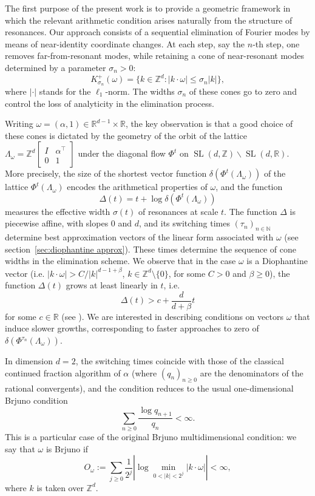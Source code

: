 \documentclass[12pt,reqno,a4paper]{amsart}%
\numberwithin{equation}{section}
\newcommand{\Nn}{{\mathbb{N}}}
\newcommand{\Rr}{{\mathbb{R}}}
\newcommand{\Zz}{{\mathbb{Z}}}
\def\SL{\operatorname{SL}}
\newcommand{\abs}[1]{\left| #1\right|}
\begin{document}
The first purpose of the present work is to provide a geometric framework in which the relevant arithmetic condition arises naturally from the structure of resonances.
Our approach consists of a sequential elimination of Fourier modes by means of near-identity coordinate changes. 
At each step,  say the $n$-th step, one removes  far-from-resonant modes, while retaining a cone of near-resonant modes determined by a parameter $\sigma_n>0$:
\[
K_{\sigma_n}^+(\omega)=\{k\in\Zz^d : |k\cdot\omega|\le \sigma_n |k|\},
\]
where $|\cdot|$ stands for the $\ell_1$-norm. 
The widths $\sigma_n$ of these cones go to zero and control the loss of analyticity in the elimination process.

Writing $\omega=(\alpha,1)\in\Rr^{d-1}\times \Rr$, the key observation is that a good choice of these cones is dictated by the geometry of the orbit of the lattice $\Lambda_\omega=\Zz^d \left[\begin{smallmatrix}I&\alpha^\top\\0&1\end{smallmatrix}\right]$
under the diagonal flow $\Phi^t$ on $\SL(d,\Zz)\backslash\SL(d,\Rr)$. 
More precisely, the size of the shortest vector function
$\delta(\Phi^t(\Lambda_\omega))$ of the lattice $\Phi^t(\Lambda_\omega)$
encodes the arithmetical properties of $\omega$, and the function
\[
\Delta(t)=t+\log\delta(\Phi^t(\Lambda_\omega))
\]
measures the effective width $\sigma(t)$ of resonances at scale $t$.
The function $\Delta$ is piecewise affine, with slopes $0$ and $d$, and its switching times $(\tau_n)_{n\in\Nn}$ determine best approximation vectors of the linear form associated with $\omega$ (see section~\ref{sec:diophantine approx}). 
These times determine the sequence of cone widths in the elimination scheme.  
We observe that in the case $\omega$ is a Diophantine vector (i.e.  $|k\cdot\omega|>C/|k|^{d-1+\beta}$,  $k\in\Zz^{d}\setminus\{0\}$, for some $C>0$ and $\beta\geq0$), the function $\Delta(t)$ grows at least linearly in $t$,  i.e.
$$
\Delta(t)>c+\frac{d}{d+\beta} t
$$ 
for some $c\in\Rr$ (see \cite[Proposition 2.3]{jld10}).
We are interested  in describing conditions on vectors $\omega$ that induce slower growths, corresponding to faster approaches to zero of $\delta(\Phi^{\tau_n}(\Lambda_\omega))$.


In dimension $d=2$, the switching times coincide with those of the classical continued fraction algorithm of $\alpha$ (where $(q_n)_{n\geq0}$ are the denominators of the rational convergents), and the condition reduces to the usual one-dimensional Brjuno condition
\begin{equation}\label{eq: BC 1-dim}
\sum_{n\geq0}\frac{\log q_{n+1}}{q_n} <\infty.
\end{equation}
This is a particular case of the original Brjuno multidimensional condition: we say that $\omega$ is Brjuno if 
$$
O_\omega:=\sum_{j\geq0}\frac1{2^j}
\abs{\log\min_{0<|k|<2^j}|k\cdot\omega|} <\infty,
$$
where $k$ is taken over $\Zz^d$.  
\end{document}

